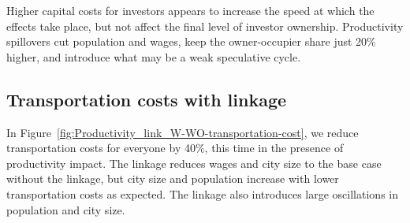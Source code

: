 Higher capital costs for investors appears to increase the speed at which the effects take place, but not affect the final level of investor ownership. Productivity spillovers cut population and wages, keep the owner-occupier share just 20\% higher, and introduce what may be a weak speculative cycle. %


\newpage

\subsection{Transportation costs  with linkage}\label{subsec-transport-link}

In Figure~\ref{fig:Productivity_link_W-WO-transportation-cost}, we reduce transportation costs for everyone by 40\%, this time in the presence of productivity impact. The linkage reduces wages and city size to the base case without the linkage, but city size and population increase with lower transportation costs as expected. The linkage also introduces large oscillations in population and city size.  %



